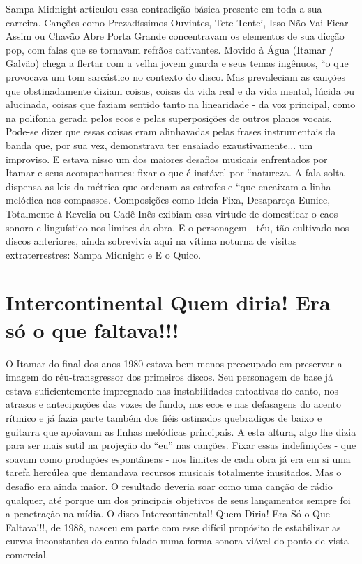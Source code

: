 Sampa Midnight articulou essa contradição básica presente em toda a sua
carreira. Canções como Prezadíssimos Ouvintes, Tete Tentei, Isso Não Vai
Ficar Assim ou Chavão Abre Porta Grande concentravam os elementos de sua
dicção pop, com falas que se tornavam refrãos cativantes. Movido à Água
(Itamar / Galvão) chega a flertar com a velha jovem guarda e seus temas
ingênuos, ``o que provocava um tom sarcástico no contexto do disco. Mas
prevaleciam as canções que obstinadamente diziam coisas, coisas da vida
real e da vida mental, lúcida ou alucinada, coisas que faziam sentido
tanto na linearidade - da voz principal, como na polifonia gerada pelos
ecos e pelas superposições de outros planos vocais. Pode-se dizer que
essas coisas eram alinhavadas pelas frases instrumentais da banda que,
por sua vez, demonstrava ter ensaiado exaustivamente... um improviso. E
estava nisso um dos maiores desafios musicais enfrentados por Itamar e
seus acompanhantes: fixar o que é instável por ``natureza. A fala solta
dispensa as leis da métrica que ordenam as estrofes e ``que encaixam a
linha melódica nos compassos. Composições como Ideia Fixa, Desapareça
Eunice, Totalmente à Revelia ou Cadê Inês exibiam essa virtude de
domesticar o caos sonoro e linguístico nos limites da obra. E o
personagem- -téu, tão cultivado nos discos anteriores, ainda sobrevivia
aqui na vítima noturna de visitas extraterrestres: Sampa Midnight e E o
Quico.

\section{Intercontinental Quem diria! Era só o que faltava!!!}

O Itamar do final dos anos 1980 estava bem menos preocupado em preservar
a imagem do réu-transgressor dos primeiros discos. Seu personagem de
base já estava suficientemente impregnado nas instabilidades entoativas
do canto, nos atrasos e antecipações das vozes de fundo, nos ecos e nas
defasagens do acento rítmico e já fazia parte também dos fiéis ostinados
quebradiços de baixo e guitarra que apoiavam as linhas melódicas
principais. A esta altura, algo lhe dizia para ser mais sutil na
projeção do ``eu'' nas canções. Fixar essas indefinições - que soavam
como produções espontâneas - nos limites de cada obra já era em si uma
tarefa hercúlea que demandava recursos musicais totalmente inusitados.
Mas o desafio era ainda maior. O resultado deveria soar como uma canção
de rádio qualquer, até porque um dos principais objetivos de seus
lançamentos sempre foi a penetração na mídia. O disco Intercontinental!
Quem Diria! Era Só o Que Faltava!!!, de 1988, nasceu em parte com esse
difícil propósito de estabilizar as curvas inconstantes do canto-falado
numa forma sonora viável do ponto de vista comercial.

